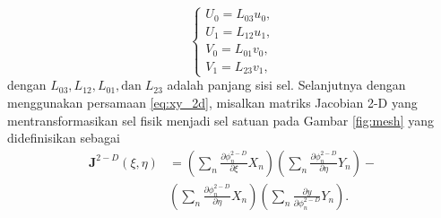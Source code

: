 \documentclass{beamer}
\begin{document}
\begin{frame}[allowframebreaks]
	\begin{equation}\label{eq:linearflux}
		\begin{cases}
			U_0	= L_{03} u_0, \\
			U_1	= L_{12} u_1, \\
			V_0	= L_{01} v_0, \\
			V_1	= L_{23} v_1, 
		\end{cases}
	\end{equation}
	dengan $L_{03},L_{12},L_{01},\text{dan}\;L_{23}$ adalah panjang sisi sel. Selanjutnya dengan menggunakan persamaan \ref{eq:xy_2d}, misalkan matriks Jacobian 2-D yang mentransformasikan sel fisik menjadi sel satuan pada Gambar \ref{fig:mesh} yang didefinisikan sebagai
	\begin{equation}\label{eq:jacob_2d}
		\begin{aligned}
		\textbf{J}^{2-D}(\xi,\eta)&= \left(\sum_n\frac{\partial \phi_n^{2-D}}{\partial \xi}X_n\right)\left(\sum_n\frac{\partial \phi_n^{2-D}}{\partial \eta}Y_n\right)- \\
		& \left(\sum_n\frac{\partial \phi_n^{2-D}}{\partial \eta}X_n\right) \left(\sum_n\frac{\partial y}{\partial \phi_n^{2-D}}Y_n \right).
		\end{aligned}
	\end{equation}
	

\end{frame}
\end{document}
